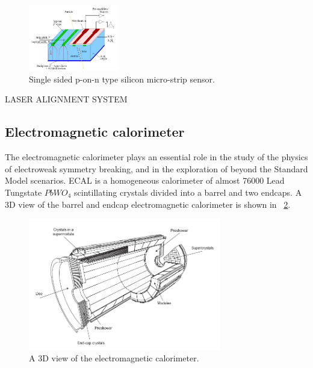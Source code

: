 \begin{figure}[htbp]
\centering
\includegraphics[width=0.35\textwidth]{Images/Silicon_structure}
\caption{Single sided p-on-n type silicon micro-strip sensor.}
\label{Silicon_structure}
\end{figure}

LASER ALIGNMENT SYSTEM

\subsection{Electromagnetic calorimeter}
The electromagnetic calorimeter plays an essential role in the study of the physics of electroweak symmetry breaking, and  in the exploration of  beyond the Standard Model scenarios.  ECAL is a homogeneous calorimeter of almost 76000 Lead Tungstate $PbWO_4$ scintillating crystals divided into a barrel and two endcaps.
A $3$D view of the barrel and endcap electromagnetic calorimeter is shown in \figurename~\ref{ECAL_3D}.
\begin{figure}[h!]
 \centering
 \includegraphics[width=0.75\textwidth]{Images/ECAL_3D}
 \caption{A $3$D view of the electromagnetic calorimeter.}
\label{ECAL_3D}
\end{figure}


